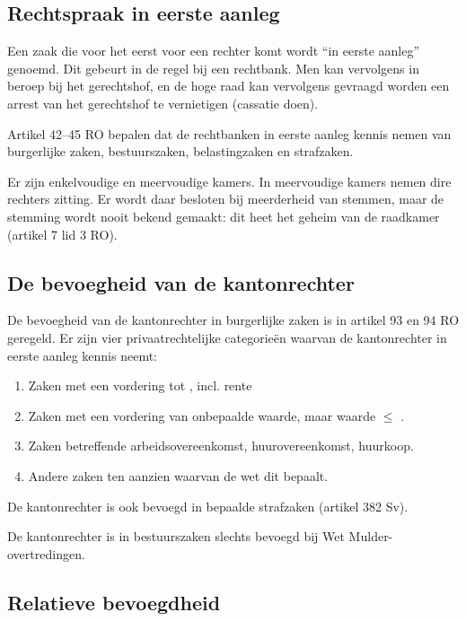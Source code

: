 \documentclass{article}
\begin{document}
\subsection{Rechtspraak in eerste aanleg}

Een zaak die voor het eerst voor een rechter komt wordt ``in eerste aanleg''
genoemd. Dit gebeurt in de regel bij een rechtbank. Men kan vervolgens in
beroep bij het gerechtshof, en de hoge raad kan vervolgens gevraagd worden een
arrest van het gerechtshof te vernietigen (cassatie doen).

Artikel 42--45 RO bepalen dat de rechtbanken in eerste aanleg kennis nemen van
burgerlijke zaken, bestuurszaken, belastingzaken en strafzaken.

Er zijn enkelvoudige en meervoudige kamers. In meervoudige kamers nemen dire
rechters zitting. Er wordt daar besloten bij meerderheid van stemmen, maar de
stemming wordt nooit bekend gemaakt: dit heet het geheim van de raadkamer
(artikel 7 lid 3 RO).

\subsection{De bevoegheid van de kantonrechter}

De bevoegheid van de kantonrechter in burgerlijke zaken is in artikel 93 en 94
RO geregeld. Er zijn vier privaatrechtelijke categorieën waarvan de
kantonrechter in eerste aanleg kennis neemt:

\begin{enumerate}
  \item Zaken met een vordering tot  , incl. rente
  \item Zaken met een vordering van onbepaalde waarde, maar waarde $\leq$ .
  \item Zaken betreffende arbeidsovereenkomst, huurovereenkomst, huurkoop.
  \item Andere zaken ten aanzien waarvan de wet dit bepaalt.
\end{enumerate}

De kantonrechter is ook bevoegd in bepaalde strafzaken (artikel 382 Sv).

De kantonrechter is in bestuurszaken slechts bevoegd bij Wet
Mulder-overtredingen.

\subsection{Relatieve bevoegdheid}
\end{document}
